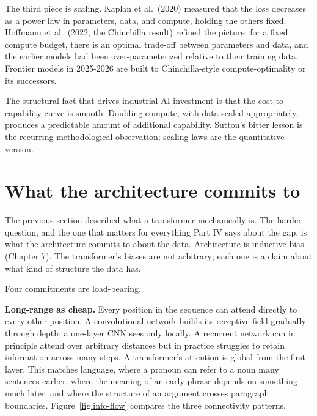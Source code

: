 The third piece is scaling. Kaplan et al.\ (2020) measured that the loss decreases as a power law in parameters, data, and compute, holding the others fixed. Hoffmann et al.\ (2022, the Chinchilla result) refined the picture: for a fixed compute budget, there is an optimal trade-off between parameters and data, and the earlier models had been over-parameterized relative to their training data. Frontier models in 2025-2026 are built to Chinchilla-style compute-optimality or its successors.

The structural fact that drives industrial AI investment is that the cost-to-capability curve is smooth. Doubling compute, with data scaled appropriately, produces a predictable amount of additional capability. Sutton's bitter lesson is the recurring methodological observation; scaling laws are the quantitative version.

\section*{What the architecture commits to}

The previous section described what a transformer mechanically is. The harder question, and the one that matters for everything Part IV says about the gap, is what the architecture commits to about the data. Architecture is inductive bias (Chapter 7). The transformer's biases are not arbitrary; each one is a claim about what kind of structure the data has.

Four commitments are load-bearing.

\textbf{Long-range as cheap.} Every position in the sequence can attend directly to every other position. A convolutional network builds its receptive field gradually through depth; a one-layer CNN sees only locally. A recurrent network can in principle attend over arbitrary distances but in practice struggles to retain information across many steps. A transformer's attention is global from the first layer. This matches language, where a pronoun can refer to a noun many sentences earlier, where the meaning of an early phrase depends on something much later, and where the structure of an argument crosses paragraph boundaries. Figure~\ref{fig:info-flow} compares the three connectivity patterns.

